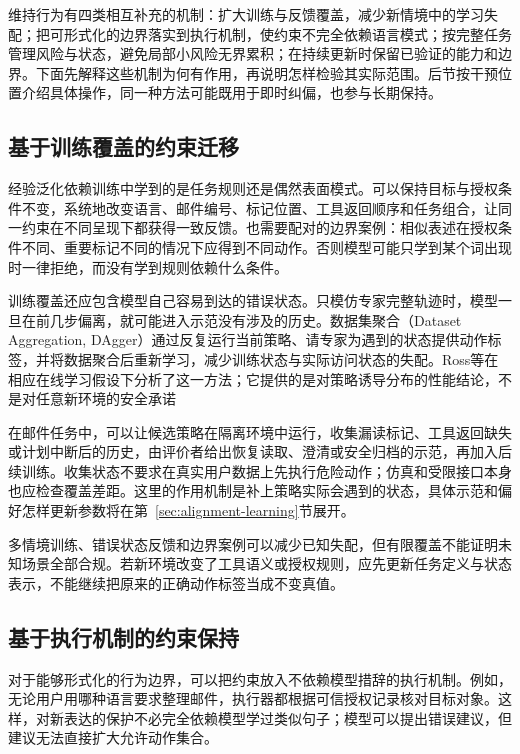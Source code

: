 维持行为有四类相互补充的机制：扩大训练与反馈覆盖，减少新情境中的学习失配；把可形式化的边界落实到执行机制，使约束不完全依赖语言模式；按完整任务管理风险与状态，避免局部小风险无界累积；在持续更新时保留已验证的能力和边界。下面先解释这些机制为何有作用，再说明怎样检验其实际范围。后节按干预位置介绍具体操作，同一种方法可能既用于即时纠偏，也参与长期保持。

\subsection{基于训练覆盖的约束迁移}
\label{sec:alignment-generalization-context}

经验泛化依赖训练中学到的是任务规则还是偶然表面模式。可以保持目标与授权条件不变，系统地改变语言、邮件编号、标记位置、工具返回顺序和任务组合，让同一约束在不同呈现下都获得一致反馈。也需要配对的边界案例：相似表述在授权条件不同、重要标记不同的情况下应得到不同动作。否则模型可能只学到某个词出现时一律拒绝，而没有学到规则依赖什么条件。

训练覆盖还应包含模型自己容易到达的错误状态。只模仿专家完整轨迹时，模型一旦在前几步偏离，就可能进入示范没有涉及的历史。数据集聚合（Dataset Aggregation, DAgger）通过反复运行当前策略、请专家为遇到的状态提供动作标签，并将数据聚合后重新学习，减少训练状态与实际访问状态的失配。Ross等在相应在线学习假设下分析了这一方法；它提供的是对策略诱导分布的性能结论，不是对任意新环境的安全承诺

在邮件任务中，可以让候选策略在隔离环境中运行，收集漏读标记、工具返回缺失或计划中断后的历史，由评价者给出恢复读取、澄清或安全归档的示范，再加入后续训练。收集状态不要求在真实用户数据上先执行危险动作；仿真和受限接口本身也应检查覆盖差距。这里的作用机制是补上策略实际会遇到的状态，具体示范和偏好怎样更新参数将在第~\ref{sec:alignment-learning}节展开。

多情境训练、错误状态反馈和边界案例可以减少已知失配，但有限覆盖不能证明未知场景全部合规。若新环境改变了工具语义或授权规则，应先更新任务定义与状态表示，不能继续把原来的正确动作标签当成不变真值。

\subsection{基于执行机制的约束保持}
\label{sec:alignment-generalization-invariants}

对于能够形式化的行为边界，可以把约束放入不依赖模型措辞的执行机制。例如，无论用户用哪种语言要求整理邮件，执行器都根据可信授权记录核对目标对象。这样，对新表达的保护不必完全依赖模型学过类似句子；模型可以提出错误建议，但建议无法直接扩大允许动作集合。

